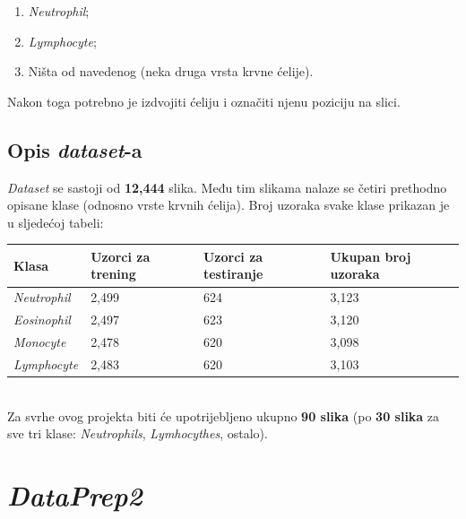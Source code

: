 \documentclass[12pt,a4paper]{article}
\renewcommand{\arraystretch}{1.5}
\begin{document}
\begin{enumerate}

\item \textit{Neutrophil};
\item \textit{Lymphocyte};
\item Ništa od navedenog (neka druga vrsta krvne ćelije).

\end{enumerate}

Nakon toga potrebno je izdvojiti ćeliju i označiti njenu poziciju na slici.

\subsection{Opis \textit{dataset}-a}

\textit{Dataset} se sastoji od \textbf{12,444} slika. Među tim slikama nalaze se četiri prethodno opisane klase (odnosno vrste krvnih ćelija). Broj uzoraka svake klase prikazan je u sljedećoj tabeli: \\

\begin{center}
\def\arraystretch{1.5}%
\begin{tabular}{| p{3cm} | p{3cm} | p{3cm} | p{3cm} |} \hline

\textbf{Klasa} 						& \textbf{Uzorci za trening}			& \textbf{Uzorci za testiranje}			& \textbf{Ukupan broj uzoraka} 	\\ \hline
\textit{Neutrophil} 					& 2,499								& 624								& 3,123	  						\\ \hline
\textit{Eosinophil} 					& 2,497								& 623								& 3,120	  						\\ \hline
\textit{Monocyte} 					& 2,478								& 620								& 3,098	  						\\ \hline
\textit{Lymphocyte} 					& 2,483								& 620								& 3,103	  						\\ \hline

\end{tabular}
\end{center}

~\\

Za svrhe ovog projekta biti će upotrijebljeno ukupno \textbf{90 slika} (po \textbf{30 slika} za sve tri klase: \textit{Neutrophils}, \textit{Lymhocythes}, ostalo).

\newpage

\section{\textit{DataPrep2}}
\end{document}
